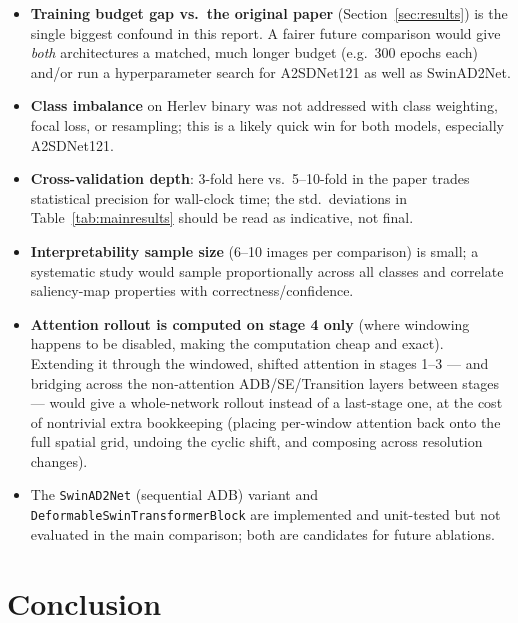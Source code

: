 \documentclass[10pt,twocolumn]{article}
\newcommand{\code}[1]{\texttt{\small #1}}
\begin{document}
\begin{itemize}[leftmargin=*,itemsep=2pt,topsep=2pt]
    \item \textbf{Training budget gap vs.\ the original paper} (Section~\ref{sec:results}) is the single biggest confound in this report. A fairer future comparison would give \emph{both} architectures a matched, much longer budget (e.g.\ 300 epochs each) and/or run a hyperparameter search for A2SDNet121 as well as SwinAD2Net.
    \item \textbf{Class imbalance} on Herlev binary was not addressed with class weighting, focal loss, or resampling; this is a likely quick win for both models, especially A2SDNet121.
    \item \textbf{Cross-validation depth}: 3-fold here vs.\ 5--10-fold in the paper trades statistical precision for wall-clock time; the std.\ deviations in Table~\ref{tab:mainresults} should be read as indicative, not final.
    \item \textbf{Interpretability sample size} (6--10 images per comparison) is small; a systematic study would sample proportionally across all classes and correlate saliency-map properties with correctness/confidence.
    \item \textbf{Attention rollout is computed on stage 4 only} (where windowing happens to be disabled, making the computation cheap and exact). Extending it through the windowed, shifted attention in stages 1--3 --- and bridging across the non-attention ADB/SE/Transition layers between stages --- would give a whole-network rollout instead of a last-stage one, at the cost of nontrivial extra bookkeeping (placing per-window attention back onto the full spatial grid, undoing the cyclic shift, and composing across resolution changes).
    \item The \code{SwinAD2Net} (sequential ADB) variant and \code{DeformableSwinTransformerBlock} are implemented and unit-tested but not evaluated in the main comparison; both are candidates for future ablations.
\end{itemize}

\section{Conclusion}
\end{document}
